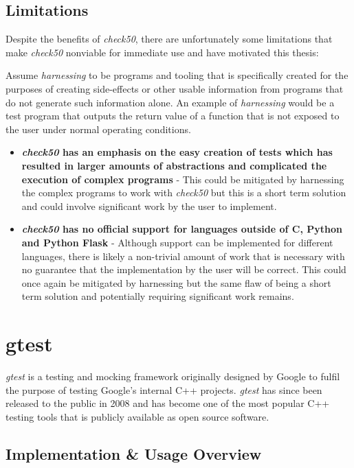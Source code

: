\documentclass[hidelinks]{report}
\begin{document}
\subsection{Limitations}

Despite the benefits of \textit{check50}, there are unfortunately some limitations that make \textit{check50} nonviable for immediate use and have motivated this thesis:

Assume \textit{harnessing} to be programs and tooling that is specifically created for the purposes of creating side-effects or other usable information from programs that do not generate such information alone. An example of \textit{harnessing} would be a test program that outputs the return value of a function that is not exposed to the user under normal operating conditions. 

\begin{itemize}
	\item \textbf{\textit{check50} has an emphasis on the easy creation of tests which has resulted in larger amounts of abstractions and complicated the execution of complex programs} - This could be mitigated by harnessing the complex programs to work with \textit{check50} but this is a short term solution and could involve significant work by the user to implement.
	\item \textbf{\textit{check50} has no official support for languages outside of C, Python and Python Flask} - Although support can be implemented for different languages, there is likely a non-trivial amount of work that is necessary with no guarantee that the implementation by the user will be correct. This could once again be mitigated by harnessing but the same flaw of being a short term solution and potentially requiring significant work remains.
\end{itemize}

\clearpage
\section{gtest}

\textit{gtest} is a testing and mocking framework originally designed by Google to fulfil the purpose of testing Google's internal C++ projects. \textit{gtest} has since been released to the public in 2008 and has become one of the most popular C++ testing tools that is publicly available as open source software.

\subsection{Implementation \& Usage Overview}
\end{document}
